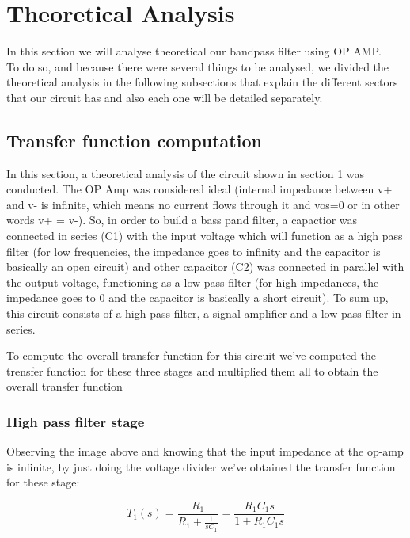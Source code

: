 \section{Theoretical Analysis}
\label{sec:analysis}

In this section we will analyse theoretical our bandpass filter using OP AMP. \\
To do so, and because there were several things to be analysed, we divided the theoretical analysis in the following subsections that explain the different sectors that our circuit has and also each one will be detailed separately.\\

\subsection{Transfer function computation}

In this section, a theoretical analysis of the circuit shown in section 1 was conducted. The OP Amp was considered ideal (internal impedance between v+ and v- is infinite, which means no current flows through it and vos=0 or in other words v+ = v-). So, in order to build a bass pand filter, a capactior was connected in series (C1) with the input voltage which will function as a high pass filter (for low frequencies, the impedance goes to infinity and the capacitor is basically an open circuit)  and other capacitor (C2) was connected in parallel with the output voltage, functioning as a low pass filter (for high impedances, the impedance goes to 0 and the capacitor is basically a short circuit). To sum up, this circuit consists of a high pass filter, a signal amplifier and a low pass filter in series.

To compute the overall transfer function for this circuit we've computed the trensfer function for these three stages and multiplied them all to obtain the overall transfer function

\subsubsection{High pass filter stage}


Observing the image above and knowing that the input impedance at the op-amp is infinite, by just doing the voltage divider we've obtained the transfer function for these stage:

\begin{equation}
T_1(s) = \frac{R_1}{R_1 + \frac{1}{sC_1}} = \frac{R_1C_1s}{1+R_1C_1s}
\end{equation}   


